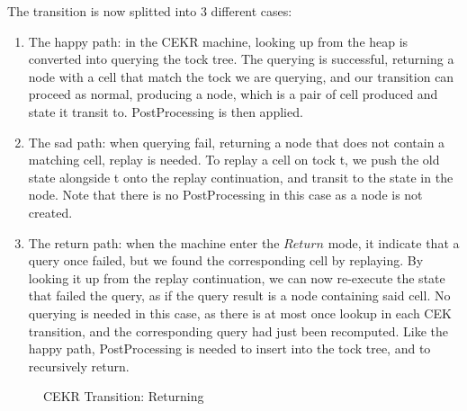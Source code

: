 The transition is now splitted into 3 different cases:
\begin{enumerate}
	\item The happy path: in the CEKR machine, looking up from the heap is converted into querying the tock tree. The querying is successful, returning a node with a cell that match the tock we are querying, and our transition can proceed as normal, producing a node, which is a pair of cell produced and state it transit to. PostProcessing is then applied.
	\item The sad path: when querying fail, returning a node that does not contain a matching cell, replay is needed. To replay a cell on tock t, we push the old state alongside t onto the replay continuation, and transit to the state in the node. Note that there is no PostProcessing in this case as a node is not created.
	\item The return path: when the machine enter the $Return$ mode, it indicate that a query once failed, but we found the corresponding cell by replaying. By looking it up from the replay continuation, we can now re-execute the state that failed the query, as if the query result is a node containing said cell. No querying is needed in this case, as there is at most once lookup in each CEK transition, and the corresponding query had just been recomputed. Like the happy path, PostProcessing is needed to insert into the tock tree, and to recursively return.
\end{enumerate}

\begin{figure}
	\caption{CEKR Transition: Returning}
\end{figure}

